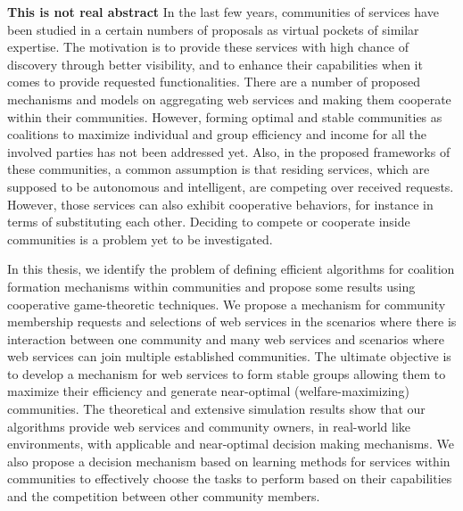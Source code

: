 
 \textbf{This is not real abstract} In the last few years, communities of services have been studied in a certain numbers of proposals as virtual pockets of similar expertise. The motivation is to provide these services with high chance of discovery through better visibility, and to enhance their capabilities when it comes to provide requested functionalities. There are a number of proposed mechanisms and models on aggregating web services and making them cooperate within their communities. However, forming optimal and stable communities as coalitions to maximize individual and group efficiency and income for all the involved parties has not been addressed yet. Also, in the proposed frameworks of these communities, a common assumption is that residing services, which are supposed to be autonomous and intelligent, are competing over received requests. However, those services can also exhibit cooperative behaviors, for instance in terms of substituting each other. Deciding to compete or cooperate inside communities is a problem yet to be investigated.


In this thesis, we identify the problem of defining efficient algorithms for coalition formation mechanisms within communities and propose some results using cooperative game-theoretic techniques. We propose a mechanism for community membership requests and selections of web services in the scenarios where there is interaction between one community and many web services and scenarios where web services can join multiple established communities. The ultimate objective is to develop a mechanism for web services to form stable groups allowing them to maximize their efficiency and generate near-optimal (welfare-maximizing) communities. The theoretical and extensive simulation results show that our algorithms provide web services and community owners, in real-world like environments, with applicable and near-optimal decision making mechanisms. We also propose a decision mechanism based on learning methods for services within communities to effectively choose the tasks to perform based on their capabilities and the competition between other community members.
\\


